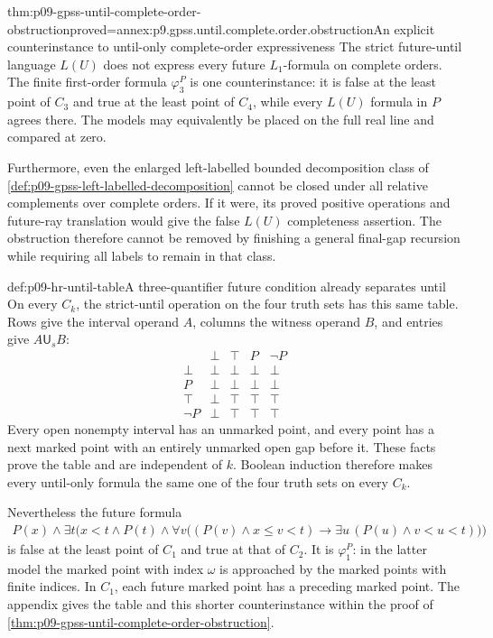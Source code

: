 \begin{hbcorollary}{thm:p09-gpss-until-complete-order-obstruction}{proved=annex:p9.gpss.until.complete.order.obstruction}{An explicit counterinstance to until-only complete-order expressiveness}
The strict future-until language \(L(U)\) does not express
every future \(L_1\)-formula on complete orders.
The finite first-order formula \(\varphi_3^P\) is one
counterinstance: it is false at the least point of
\(C_3\) and true at the least point of \(C_4\),
while every \(L(U)\) formula in \(P\) agrees there.
The models may equivalently be placed on the full real
line and compared at zero.

Furthermore, even the enlarged left-labelled bounded
decomposition class of
\cref{def:p09-gpss-left-labelled-decomposition} cannot
be closed under all relative complements over complete
orders. If it were, its proved positive operations and
future-ray translation would give the false \(L(U)\)
completeness assertion. The obstruction therefore cannot
be removed by finishing a general final-gap recursion
while requiring all labels to remain in that class.
\end{hbcorollary}

\begin{hbexample}{def:p09-hr-until-table}{A three-quantifier future condition already separates until}
On every \(C_k\), the strict-until operation on the four truth sets
has this same table. Rows give the interval operand \(A\), columns
the witness operand \(B\), and entries give \(A\mathbin{\mathsf U_s}B\):
\[
\begin{array}{c|cccc}
 &\bot&\top&P&\neg P\\ \hline
 \bot&\bot&\bot&\bot&\bot\\
 P&\bot&\bot&\bot&\bot\\
 \top&\bot&\top&\top&\top\\
 \neg P&\bot&\top&\top&\top
\end{array}
\]
Every open nonempty interval has an unmarked point, and every point
has a next marked point with an entirely unmarked open gap before it.
These facts prove the table and are independent of \(k\).
Boolean induction therefore makes every until-only formula the
same one of the four truth sets on every \(C_k\).

Nevertheless the future formula
\[
\begin{split}
 P(x)\land\exists t\bigl(x<t\land P(t)\land
  \forall v\bigl((P(v)\land x\leq v<t)\to
        \exists u\,(P(u)\land v<u<t)\bigr)\bigr)
\end{split}
\]
is false at the least point of \(C_1\) and true at that of
\(C_2\). It is \(\varphi_1^P\): in the latter model the
marked point with index \(\omega\) is approached by the
marked points with finite indices. In \(C_1\), each
future marked point has a preceding marked point.
The appendix gives the table and this shorter counterinstance
within the proof of
\cref{thm:p09-gpss-until-complete-order-obstruction}.
\end{hbexample}

